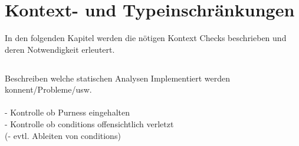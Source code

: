 \section{Kontext- und Typeinschränkungen}

In den folgenden Kapitel werden die nötigen Kontext Checks beschrieben und 
deren Notwendigkeit erleutert.

\subsection{}

Beschreiben welche statischen Analysen Implementiert werden konnent/Probleme/usw.\\
\\
- Kontrolle ob Purness eingehalten\\
- Kontrolle ob conditions offensichtlich verletzt\\
(- evtl. Ableiten von conditions)




